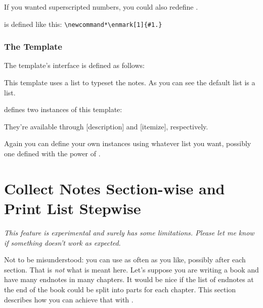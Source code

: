 \documentclass[toc=bib,toc=index]{cnpkgdoc}
\begin{document}
If you wanted superscripted numbers, you could also redefine . 
\begin{beschreibung}
 \newline
   is defined like this: \verb=\newcommand*\enmark[1]{#1.}=
\end{beschreibung}

\subsubsection{The  Template}
The  template's interface is defined as follows:
This template uses a list to typeset the notes. As you can see the default list
is a  list.

\enotez defines two instances of this template:
\begin{beispiel}
\end{beispiel}
They're available through [description] and
[itemize], respectively.

Again you can define your own instances using whatever list you want, possibly
one defined with the power of .

\section{Collect Notes Section-wise and Print List Stepwise}\label{sec:split}
\emph{This feature is experimental and surely has some limitations. Please let
me know if something doesn't work as expected}.

Not to be misunderstood: you can use  as often as you like,
possibly after each section. That is \emph{not} what is meant here. Let's
suppose you are writing a book and have many endnotes in many chapters. It
would be nice if the list of endnotes at the end of the book could be split
into parts for each chapter. This section describes how you can achieve that with
\enotez.
\end{document}

